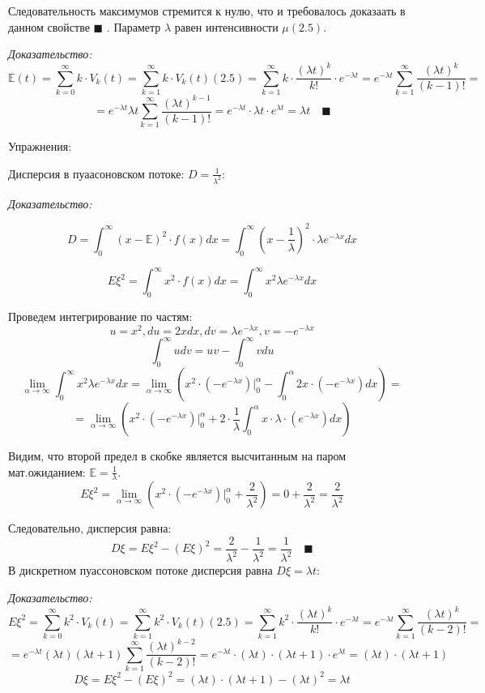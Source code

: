 \documentclass[aps,%
12pt,%
final,%
oneside,
onecolumn,%
musixtex, %
superscriptaddress,%
centertags]{article} %
\theoremstyle{plain}
\begin{document}
Следовательность максимумов стремится к нулю, что и требовалось доказаать в данном свойстве $\blacksquare$
. Параметр $\lambda $ равен интенсивности $\mu (2.5)$.

\textit{Доказательство:}
$$\mathbb{E}(t) =\sum_{k=0}^{\infty} k \cdot V_k(t) = \sum_{k=1}^{\infty} k \cdot V_k(t) (2.5) = \sum_{k=1}^{\infty} k \cdot \frac{(\lambda t)^k}{k!} \cdot e^{-\lambda t} =e^{-\lambda t}  \sum_{k=1}^{\infty} \frac{(\lambda t)^k}{(k-1)!} =$$
$$=e^{-\lambda t} \lambda t \sum_{k=1}^{\infty} \frac{(\lambda t)^{k-1}}{(k-1)!} = e^{-\lambda t} \cdot \lambda t \cdot e^{\lambda t} = \lambda t \quad \blacksquare$$


Упражнения:

Дисперсия в пуаасоновском потоке: $D = \frac{1}{\lambda^2}$:

\textit{Доказательство:}

$$D = \int_{0}^{\infty} (x - \mathbb{E} )^2 \cdot f(x) dx =  \int_{0}^{\infty} \left (x - \frac{1}{\lambda} \right)^2 \cdot \lambda e^{-\lambda x} dx$$

$$E \xi^2 = \int_{0}^{\infty} x^2 \cdot f(x) dx = \int_{0}^{\infty} x^2 \lambda e^{-\lambda x} dx $$

Проведем интегрирование по частям:
$$ u = x^2, du = 2xdx, dv = \lambda e^{-\lambda x}, v = -e^{-\lambda x}$$
$$ \int_{0}^{\infty} udv = uv - \int_{0}^{\infty} vdu$$
$$\lim_{\alpha \to \infty} \int_{0}^{\infty} x^2 \lambda e^{-\lambda x} dx = \lim_{\alpha \to \infty} \left (x^2 \cdot (-e^{-\lambda x}) |^{\alpha}_{0} -  \int_{0}^{\alpha} 2x\cdot (-e^{-\lambda x}) dx \right ) = $$
$$ = \lim_{\alpha \to \infty} \left (x^2 \cdot (-e^{-\lambda x}) |^{\alpha}_{0} + 2 \cdot \frac{1}{\lambda} \int_{0}^{\alpha} x \cdot \lambda\cdot (e^{-\lambda x}) dx \right )$$

Видим, что второй предел в скобке является высчитанным на паром мат.ожиданием: $\mathbb{E} = \frac{1}{\lambda}$.
$$E \xi^2 = \lim_{\alpha \to \infty} \left (x^2 \cdot (-e^{-\lambda x}) |^{\alpha}_{0} + \frac{2}{\lambda^2} \right ) = 0 + \frac{2}{\lambda^2} = \frac{2}{\lambda^2}$$

Следовательно, дисперсия равна:
$$ D \xi = E \xi^2 - (E \xi)^2 = \frac{2}{\lambda^2} - \frac{1}{\lambda^2} = \frac{1}{\lambda^2} \quad \blacksquare$$
\newpage
В дискретном пуассоновском потоке дисперсия равна $D\xi = \lambda t$:

\textit{Доказательство:}
$$E\xi^2 = \sum_{k=0}^{\infty} k^2 \cdot V_k(t) = \sum_{k=1}^{\infty} k^2 \cdot V_k(t) (2.5) = \sum_{k=1}^{\infty} k^2 \cdot \frac{(\lambda t)^k}{k!} \cdot e^{-\lambda t}=e^{-\lambda t}  \sum_{k=1}^{\infty} \frac{(\lambda t)^k}{(k-2)!} =$$
$$=e^{-\lambda t} (\lambda t)(\lambda t +1 ) \sum_{k=1}^{\infty} \frac{(\lambda t)^{k-2}}{(k-2)!} = e^{-\lambda t} \cdot (\lambda t) \cdot (\lambda t + 1) \cdot e^{\lambda t} = (\lambda t) \cdot (\lambda t + 1)$$
$$ D \xi = E \xi^2 - (E \xi)^2 = (\lambda t) \cdot (\lambda t + 1)- (\lambda t)^2 =  \lambda t$$
\end{document}

